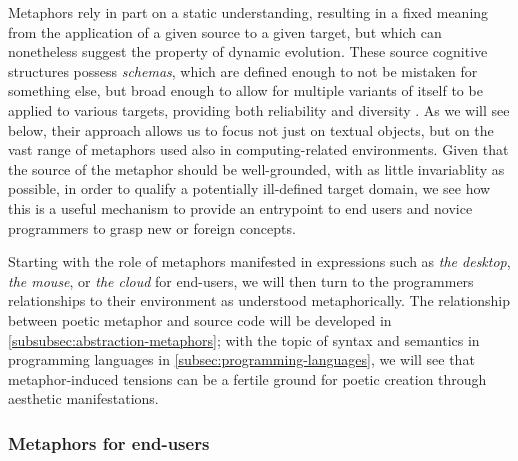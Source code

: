 Metaphors rely in part on a static understanding, resulting in a fixed meaning from the application of a given source to a given target, but which can nonetheless suggest the property of dynamic evolution. These source cognitive structures possess \emph{schemas}, which are defined enough to not be mistaken for something else, but broad enough to allow for multiple variants of itself to be applied to various targets, providing both reliability and diversity \citep{lakoff_metaphors_1980}. As we will see below, their approach allows us to focus not just on textual objects, but on the vast range of metaphors used also in computing-related environments. Given that the source of the metaphor should be well-grounded, with as little invariablity as possible, in order to qualify a potentially ill-defined target domain, we see how this is a useful mechanism to provide an entrypoint to end users and novice programmers to grasp new or foreign concepts.

Starting with the role of metaphors manifested in expressions such as \emph{the desktop}, \emph{the mouse}, or \emph{the cloud} for end-users, we will then turn to the programmers relationships to their environment as understood metaphorically. The relationship between poetic metaphor and source code will be developed in \ref{subsubsec:abstraction-metaphors}; with the topic of syntax and semantics in programming languages in \ref{subsec:programming-languages}, we will see that metaphor-induced tensions can be a fertile ground for poetic creation through aesthetic manifestations.

\subsubsection{Metaphors for end-users}
\label{subsubsec:metaphors-users}

